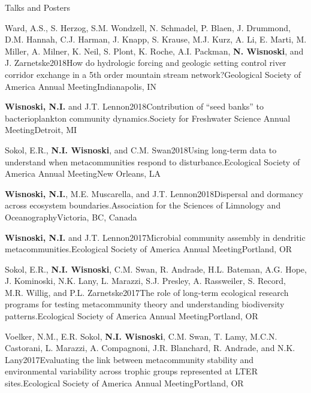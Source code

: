 \documentclass{resume} %
\begin{document}
\begin{rhangSection}{Talks and Posters}
  \begin{Presentation}{Ward, A.S., S. Herzog, S.M. Wondzell, N. Schmadel, P. Blaen, J. Drummond, D.M. Hannah, C.J. Harman, J. Knapp, S. Krause, M.J. Kurz, A. Li, E. Marti, M. Miller, A. Milner, K. Neil, S. Plont, K. Roche, A.I. Packman, {\bf N. Wisnoski}, and J. Zarnetske}{2018}{How do hydrologic forcing and geologic setting control river corridor exchange in a 5th order mountain stream network?}{Geological Society of America Annual Meeting}{Indianapolis, IN}
  \end{Presentation}
  
  \begin{Presentation}{{\bf Wisnoski, N.I.} and J.T. Lennon}{2018}{Contribution of \enquote{seed banks} to bacterioplankton community dynamics.}{Society for Freshwater Science Annual Meeting}{Detroit, MI}
  \end{Presentation}
  
  \begin{Presentation}{Sokol, E.R., {\bf N.I. Wisnoski}, and C.M. Swan}{2018}{Using long-term data to understand when metacommunities respond to disturbance.}{Ecological Society of America Annual Meeting}{New Orleans, LA}
  \end{Presentation}

  \begin{Presentation}{{\bf Wisnoski, N.I.}, M.E. Muscarella, and J.T. Lennon}{2018}{Dispersal and dormancy across ecosystem boundaries.}{Association for the Sciences of Limnology and Oceanography}{Victoria, BC, Canada}
  \end{Presentation}

  \begin{Presentation}{{\bf Wisnoski, N.I.} and J.T. Lennon}{2017}{Microbial community assembly in dendritic metacommunities.}{Ecological Society of America Annual Meeting}{Portland, OR}
  \end{Presentation}
  
  \begin{Presentation}{Sokol, E.R., {\bf N.I. Wisnoski}, C.M. Swan, R. Andrade, H.L. Bateman, A.G. Hope, J. Kominoski, N.K. Lany, L. Marazzi, S.J. Presley, A. Rassweiler, S. Record, M.R. Willig, and P.L. Zarnetske}{2017}{The role of long-term ecological research programs for testing metacommunity theory and understanding biodiversity patterns.}{Ecological Society of America Annual Meeting}{Portland, OR}
  \end{Presentation}
  
  \begin{Presentation}{Voelker, N.M., E.R. Sokol, {\bf N.I. Wisnoski}, C.M. Swan, T. Lamy, M.C.N. Castorani, L. Marazzi, A. Compagnoni, J.R. Blanchard, R. Andrade, and N.K. Lany}{2017}{Evaluating the link between metacommunity stability and environmental variability across trophic groups represented at LTER sites.}{Ecological Society of America Annual Meeting}{Portland, OR}
  \end{Presentation}


\end{rhangSection}
\end{document}
